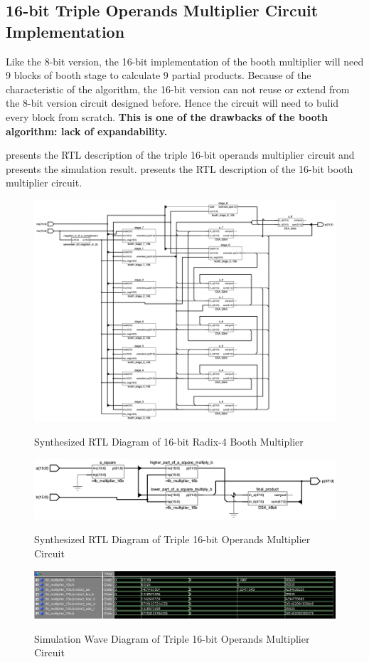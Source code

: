 \newpage
\subsection{16-bit Triple Operands Multiplier Circuit Implementation}

Like the 8-bit version, the 16-bit implementation of the booth multiplier will need 9 blocks of booth stage to calculate 9 partial products.
Because of the characteristic of the algorithm, the 16-bit version can not reuse or extend from the 8-bit version circuit designed before.
Hence the circuit will need to bulid every block from scratch.
\textbf{This is one of the drawbacks of the booth algorithm: lack of expandability.}

 presents the RTL description of the triple 16-bit operands multiplier circuit
and  presents the simulation result.  presents the RTL description of the 16-bit booth multiplier circuit.

\begin{figure}[!ht]
	\centering
	\caption{Synthesized RTL Diagram of 16-bit Radix-4 Booth Multiplier}
	\includegraphics[width=\textwidth]{../img/overview_booth_16b_rtl.png}
	\label{fig:overview_booth_16b_rtl}
\end{figure}

\begin{figure}[!ht]
	\centering
	\caption{Synthesized RTL Diagram of Triple 16-bit Operands Multiplier Circuit}
	\includegraphics[width=\textwidth]{../img/tri_16b_rtl.png}
	\label{fig:tri_16b_rtl}
\end{figure}

\begin{figure}[!ht]
	\centering
	\caption{Simulation Wave Diagram of Triple 16-bit Operands Multiplier Circuit}
	\includegraphics[width=\textwidth]{../img/tri_16b_sim.png}
	\label{fig:tri_16b_sim}
\end{figure}

\clearpage
